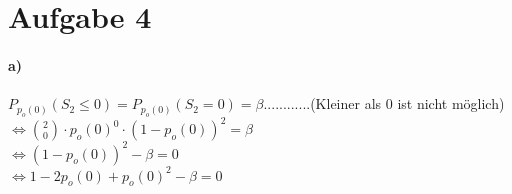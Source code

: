 \documentclass{article}
\begin{document}
		
		
		
		\section*{Aufgabe 4}
			\paragraph*{a)}
				$P_{p_o(0)}(S_2 \leq 0) = P_{p_o(0)}(S_2 = 0) = \beta$............(Kleiner als 0 ist nicht möglich)\\[1.5em]
				
				$\Leftrightarrow \binom{2}{0} \cdot p_o(0)^0 \cdot (1-p_o(0))^2 = \beta$\\[1.1em]
				
				$\Leftrightarrow (1-p_o(0))^2 - \beta = 0$\\[1.1em]
				
				$\Leftrightarrow 1 - 2p_o(0) + p_o(0)^2 - \beta = 0$\\[1.1em]
				
\end{document}
